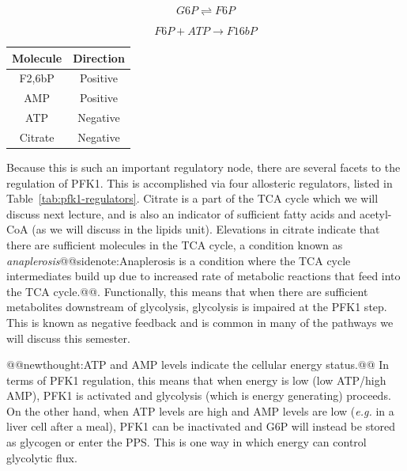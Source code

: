 \documentclass{tufte-handout}
\makeatletter
\def\newthought#1{@@newthought:#1@@}
\def\sidenote#1{@@sidenote:#1@@}
\makeatother
\begin{document}
\begin{equation}\label{eq:pgm}
G6P \rightleftharpoons F6P
\end{equation}

\begin{equation}\label{eq:pfk1}
F6P + ATP \rightarrow F16bP
\end{equation}

\begin{margintable}
\centering
\caption{Regulators of PFK1 activity}\label{tab:pfk1-regulators}
\begin{tabular}{cc}
\hline
\textbf {Molecule} & \textbf{Direction}  \\
\hline
F2,6bP & Positive \\
AMP & Positive \\
ATP & Negative \\
Citrate & Negative \\
\hline
\end{tabular}
\end{margintable}

Because this is such an important regulatory node, there are several facets to the regulation of PFK1.  This is accomplished via four allosteric regulators, listed in Table~\ref{tab:pfk1-regulators}.  Citrate is a part of the TCA cycle which we will discuss next lecture, and is also an indicator of sufficient fatty acids and acetyl-CoA (as we will discuss in the lipids unit).  Elevations in citrate indicate that there are sufficient molecules in the TCA cycle, a condition known as \emph{anaplerosis}\sidenote{Anaplerosis is a condition where the TCA cycle intermediates build up due to increased rate of metabolic reactions that feed into the TCA cycle.}.  Functionally, this means that when there are sufficient metabolites downstream of glycolysis, glycolysis is impaired at the PFK1 step.  This is known as negative feedback and is common in many of the pathways we will discuss this semester.

\newthought{ATP and AMP levels indicate the cellular energy status.}  In terms of PFK1 regulation, this means that when energy is low (low ATP/high AMP), PFK1 is activated and glycolysis (which is energy generating) proceeds.  On the other hand, when ATP levels are high and AMP levels are low (\textit{e.g.} in a liver cell after a meal), PFK1 can be inactivated and G6P will instead be stored as glycogen or enter the PPS.  This is one way in which energy can control glycolytic flux.
\end{document}
